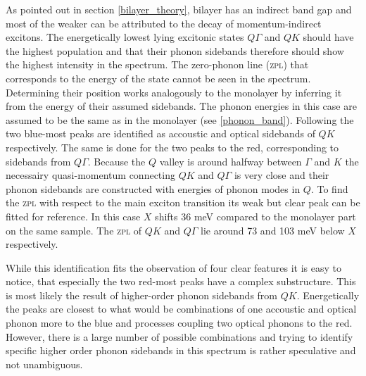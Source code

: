 As pointed out in section \ref{bilayer_theory}, bilayer \wse has an indirect band gap and most of the weaker \pl can be attributed to the decay of momentum-indirect excitons. The energetically lowest lying excitonic states $Q\Gamma$ and $QK$ should have the highest population and that their phonon sidebands therefore should show the highest intensity in the spectrum. The zero-phonon line (\textsc{zpl}) that corresponds to the energy of the state cannot be seen in the spectrum. Determining their position works analogously to the monolayer by inferring it from the energy of their assumed sidebands. The phonon energies in this case are assumed to be the same as in the monolayer (see \ref{phonon_band}). Following  \cite{lindlau_role_2017} the two blue-most peaks are identified as  accoustic and optical sidebands of $QK$ respectively. The same is done for the two peaks to the red, corresponding to sidebands from $Q\Gamma$. Because the $Q$ valley is around halfway between $\Gamma$ and $K$ the necessairy quasi-momentum connecting $QK$ and $Q\Gamma$ is very close and their phonon sidebands are constructed with energies of phonon modes in $Q$. To find the \textsc{zpl} with respect to the main exciton transition its weak but clear peak can be fitted for reference. In this case $X$ shifts 36 meV compared to the monolayer part on the same sample. The \textsc{zpl} of $QK$ and $Q\Gamma$ lie around 73 and 103 meV below $X$ respectively.

While this identification fits the observation of four clear features it is easy to notice, that especially the two red-most peaks have a complex substructure. This is most likely the result of higher-order phonon sidebands from $QK$. Energetically the peaks are closest to what would be combinations of one accoustic and optical phonon more to the blue and processes coupling two optical phonons to the red. However, there is a large number of possible combinations and trying to identify specific higher order phonon sidebands in this spectrum is rather speculative and not unambiguous.

